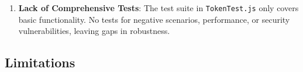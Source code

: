 \documentclass[../main.tex]{subfiles}
\begin{document}
\begin{enumerate}
    \item \textbf{Lack of Comprehensive Tests}: The test suite in \texttt{TokenTest.js} only covers basic functionality. No tests for negative scenarios, performance, or security vulnerabilities, leaving gaps in robustness.
\end{enumerate}

\subsection{Limitations}
\end{document}
